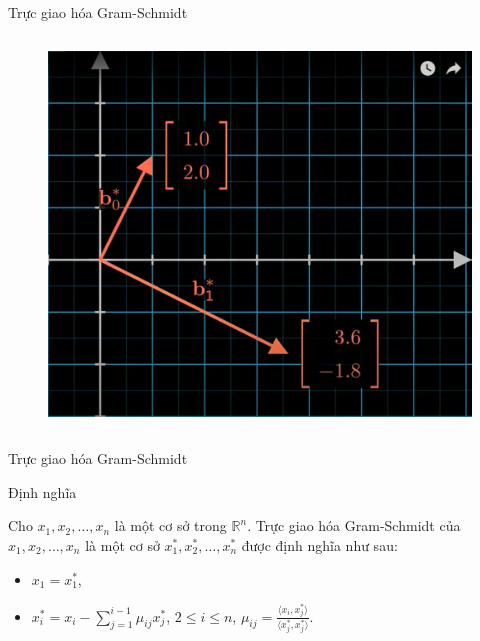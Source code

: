 \documentclass{beamer}
\numberwithin{equation}{section}
\begin{document}
\begin{frame}{Trực giao hóa Gram-Schmidt}
\begin{columns}
\begin{column}{0.5\textwidth}
\begin{figure}[h]
\centering
\includegraphics[width=\textwidth]{pictures/GramSchmidtYouTube1.png}
\end{figure}
\end{column}

\end{columns}

\end{frame}
\begin{frame}{Trực giao hóa Gram-Schmidt}

\begin{block}{Định nghĩa}

Cho $x_1, x_2, \ldots, x_n$ là một cơ sở trong $\mathbb{R}^n$.
Trực giao hóa Gram-Schmidt của $x_1, x_2, \ldots, x_n$
là một cơ sở $x_1^*, x_2^*, \ldots, x_n^*$ được định nghĩa như sau:

\begin{itemize}
\item $x_1 = x_1^*$,
\item $x_i^* = x_i - \sum_{j=1}^{i-1} \mu_{ij} x_j^*$, \quad $2 \leq i \leq n$, \quad $\mu_{ij} = \frac{\langle x_i, x_j^* \rangle}{\langle x_j^*, x_j^* \rangle}$.
\end{itemize}

\end{block}

\end{frame}
\end{document}
